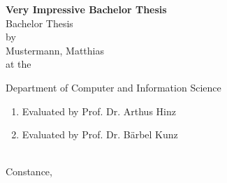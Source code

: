 
\newcommand{\MyTitle}{Very Impressive Bachelor Thesis}
\newcommand{\MyThesisType}{Bachelor Thesis}
\newcommand{\MyAuthor}{Mustermann, Matthias}

\newcommand{\MyDepartement}{Department of Computer and Information Science}

\newcommand{\MyCorrectorA}{Prof. Dr. Arthus Hinz}
\newcommand{\MyCorrectorB}{Prof. Dr. B\"arbel Kunz}

\begin{titlepage}
\pagestyle{empty}
\begin{center}

{\Huge \textbf{\MyTitle}} \\[2cm]

{\Large \MyThesisType} \\[1cm]

{\Large by \\[.3cm]
\MyAuthor} \\[1cm]

{\Large at the}


{\Large \MyDepartement}\\[1cm]

{\Large
\begin{enumerate}
    \item Evaluated by \MyCorrectorA
    \item Evaluated by \MyCorrectorB
\end{enumerate}
} \ \\[1cm]

{\Large Constance, \the\year}

\end{center}

\cleardoublepage

\pagestyle{plain}
\setcounter{page}{1}
\end{titlepage}
